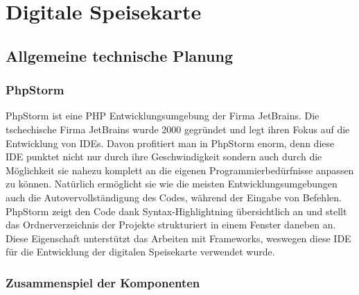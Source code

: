 \chapter{Digitale Speisekarte}
\renewcommand{\kapitelautor}{Autor: Katharina Joksch}

\section{Allgemeine technische Planung}

  \subsection{PhpStorm}
    
PhpStorm ist eine PHP Entwicklungsumgebung der Firma JetBrains. Die tschechische Firma JetBrains wurde 2000 gegründet und legt ihren Fokus auf die Entwicklung von IDEs. Davon profitiert man in PhpStorm enorm, denn diese IDE punktet nicht nur durch ihre Geschwindigkeit sondern auch durch die Möglichkeit sie nahezu komplett an die eigenen Programmierbedürfnisse anpassen zu können. Natürlich ermöglicht sie wie die meisten Entwicklungsumgebungen auch die Autovervollständigung des Codes, während der Eingabe von Befehlen. PhpStorm zeigt den Code dank Syntax-Highlightning übersichtlich an und stellt das Ordnerverzeichnis der Projekte strukturiert in einem Fenster daneben an. Diese Eigenschaft unterstützt das Arbeiten mit Frameworks, weswegen diese IDE für die Entwicklung der digitalen Speisekarte verwendet wurde.
  
  \subsection{Zusammenspiel der Komponenten}


